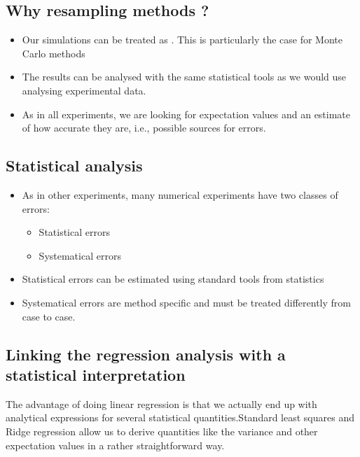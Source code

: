 \documentclass[letterpaper,10pt,english]{sphinxmanual}
\begin{document}
\subsection{Why resampling methods ?}
\label{\detokenize{chapter4:why-resampling-methods}}
\begin{itemize}
\item {} 
Our simulations can be treated as . This is particularly the case for Monte Carlo methods

\item {} 
The results can be analysed with the same statistical tools as we would use analysing experimental data.

\item {} 
As in all experiments, we are looking for expectation values and an estimate of how accurate they are, i.e., possible sources for errors.

\end{itemize}


\subsection{Statistical analysis}
\label{\detokenize{chapter4:statistical-analysis}}\begin{itemize}
\item {} 
As in other experiments, many numerical  experiments have two classes of errors:
\begin{itemize}
\item {} 
Statistical errors

\item {} 
Systematical errors

\end{itemize}

\item {} 
Statistical errors can be estimated using standard tools from statistics

\item {} 
Systematical errors are method specific and must be treated differently from case to case.

\end{itemize}




\subsection{Linking the regression analysis with a statistical interpretation}
\label{\detokenize{chapter4:linking-the-regression-analysis-with-a-statistical-interpretation}}
The
advantage of doing linear regression is that we actually end up with
analytical expressions for several statistical quantities.Standard least squares and Ridge regression  allow us to
derive quantities like the variance and other expectation values in a
rather straightforward way.
\end{document}
